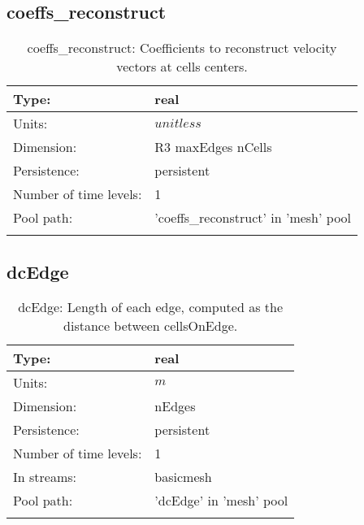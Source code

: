 \subsection[coeffs\_reconstruct]{coeffs\_reconstruct}
\label{subsec:var_sec_mesh_coeffs_reconstruct}
\begin{center}
\begin{longtable}{| p{2.0in} | p{4.0in} |}
        \hline 
        Type: & real \\
        \hline 
        Units: & $unitless$ \\
        \hline 
        Dimension: & R3 maxEdges nCells \\
        \hline 
        Persistence: & persistent \\
        \hline 
        Number of time levels: & 1 \\
        \hline 
            Pool path: & 'coeffs\_reconstruct' in 'mesh' pool
 \\
		 \hline 
    \caption{coeffs\_reconstruct: Coefficients to reconstruct velocity vectors at cells centers.}
\end{longtable}
\end{center}
\subsection[dcEdge]{dcEdge}
\label{subsec:var_sec_mesh_dcEdge}
\begin{center}
\begin{longtable}{| p{2.0in} | p{4.0in} |}
        \hline 
        Type: & real \\
        \hline 
        Units: & $m$ \\
        \hline 
        Dimension: & nEdges \\
        \hline 
        Persistence: & persistent \\
        \hline 
        Number of time levels: & 1 \\
        \hline 
		 In streams: &  basicmesh \\
        \hline 
            Pool path: & 'dcEdge' in 'mesh' pool
 \\
		 \hline 
    \caption{dcEdge: Length of each edge, computed as the distance between cellsOnEdge.}
\end{longtable}
\end{center}

